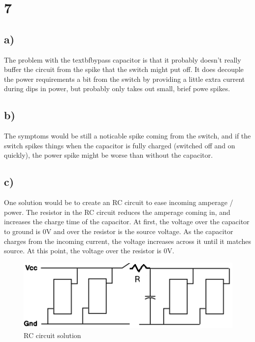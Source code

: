 \documentclass[11pt,letterpaper]{article}
\begin{document}
\section*{7}
\subsection*{a)}
The problem with the textbf{bypass capacitor} is that it probably doesn't really buffer the circuit from the
spike that the switch might put off. It does decouple the power requirements a bit from the switch by providing a little extra current during dips in power, but probably only takes out small, brief powe spikes.

\subsection*{b)}
The symptoms would be still a noticable spike coming from the switch, and if the switch spikes things 
when the capacitor is fully charged (switched off and on quickly), the power spike might be worse than
without the capacitor.

\subsection*{c)}
One solution would be to create an RC circuit to ease incoming amperage / power. The resistor in the RC
circuit reduces the amperage coming in, and increases the charge time of the capacitor. At first, the 
voltage over the capacitor to ground is 0V and over the resistor is the source voltage. As the capacitor
charges from the incoming current, the voltage increases across it until it matches source. At this point,
the voltage over the resistor is 0V.

\begin{figure}[!h]
        \begin{center}
		\includegraphics[width=120mm]{images/rc_circuit}
                \caption{RC circuit solution}
                \label{tool_layout}
        \end{center}
\end{figure}
\end{document}

